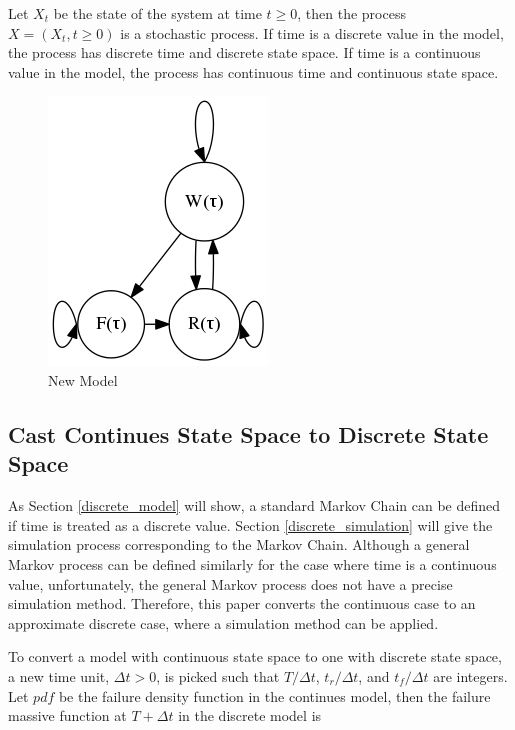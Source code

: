 Let $X_t$ be the state of the system at time $t \geq 0$, then the process $X = 
(X_t, t \geq 0)$ is a stochastic process.  If time is a discrete value in the 
model, the process has discrete time and discrete state space.  
If time is a  continuous value in the model, the process has 
continuous time and continuous state space.  




\begin{figure}
  \label{model_new}
  \centering       
  \includegraphics[scale=0.5]{model.png}
  \caption{New Model}
\end{figure}


\subsection{Cast Continues State Space to Discrete State Space}

As Section \ref{discrete_model} will show, a standard Markov Chain can be 
defined if time is treated as a discrete value.  Section 
\ref{discrete_simulation} will give the simulation process corresponding to 
the Markov Chain.  Although a general Markov process can be defined similarly 
for the case where time is a continuous value, unfortunately, the general 
Markov process does not have a precise simulation method.  Therefore, this 
paper converts the continuous case to an approximate discrete case, where a 
simulation method can be applied.  

To convert a model with continuous state space to one with discrete state space,
a new time unit, $\Delta t >  0$, is picked such that 
$T/\Delta t$, $t_r/\Delta t$, and $t_f/\Delta t$ are integers.  Let $pdf$ be 
the failure density function in the continues model, then the failure massive 
function at $T+\Delta t$ in the discrete model is 

